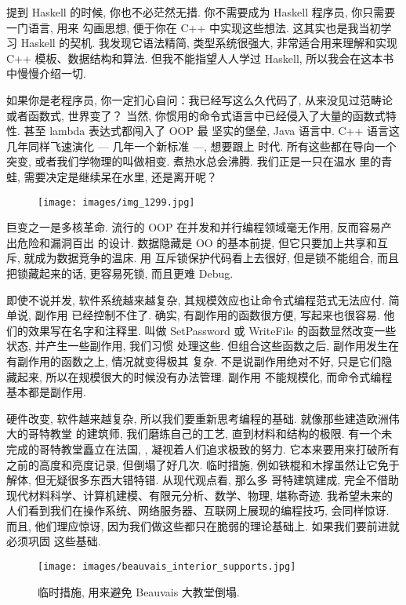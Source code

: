 提到 Haskell 的时候, 你也不必茫然无措. 你不需要成为 Haskell 程序员, 你只需要一门语言, 用来
勾画思想, 便于你在 C++ 中实现这些想法. 这其实也是我当初学习 Haskell 的契机. 我发现它语法精简,
类型系统很强大, 非常适合用来理解和实现 C++ 模板、数据结构和算法. 但我不能指望人人学过 Haskell,
所以我会在这本书中慢慢介绍一切.

如果你是老程序员, 你一定扪心自问：我已经写这么久代码了, 从来没见过范畴论或者函数式, 世界变了？
当然, 你惯用的命令式语言中已经侵入了大量的函数式特性. 甚至 lambda 表达式都闯入了 OOP 最
坚实的堡垒, Java 语言中. C++ 语言这几年同样飞速演化 --- 几年一个新标准 ---, 想要跟上
时代. 所有这些都在导向一个突变, 或者我们学物理的叫做相变. 煮热水总会沸腾. 我们正是一只在温水
里的青蛙, 需要决定是继续呆在水里, 还是离开呢？

\begin{figure}[H]
  \centering
  \texttt{[image: images/img\_1299.jpg]}
\end{figure}

\noindent

巨变之一是多核革命. 流行的 OOP 在并发和并行编程领域毫无作用, 反而容易产出危险和漏洞百出
的设计. 数据隐藏是 OO 的基本前提, 但它只要加上共享和互斥, 就成为数据竞争的温床. 用
互斥锁保护代码看上去很好, 但是锁不能组合, 而且把锁藏起来的话, 更容易死锁, 而且更难 Debug.

即使不说并发, 软件系统越来越复杂, 其规模效应也让命令式编程范式无法应付. 简单说, 副作用
已经控制不住了. 确实, 有副作用的函数很方便, 写起来也很容易. 他们的效果写在名字和注释里.
叫做 SetPassword 或 WriteFile 的函数显然改变一些状态, 并产生一些副作用, 我们习惯
处理这些. 但组合这些函数之后, 副作用发生在有副作用的函数之上, 情况就变得极其
复杂. 不是说副作用绝对不好, 只是它们隐藏起来, 所以在规模很大的时候没有办法管理. 副作用
不能规模化, 而命令式编程基本都是副作用.

硬件改变, 软件越来越复杂, 所以我们要重新思考编程的基础. 就像那些建造欧洲伟大的哥特教堂
的建筑师, 我们磨练自己的工艺, 直到材料和结构的极限. 有一个未完成的哥特教堂矗立在法国,
,
凝视着人们追求极致的努力. 它本来要用来打破所有之前的高度和亮度记录, 但倒塌了好几次.
临时措施, 例如铁棍和木撑虽然让它免于解体, 但无疑很多东西大错特错. 从现代观点看, 那么多
哥特建筑建成, 完全不借助现代材料科学、计算机建模、有限元分析、数学、物理, 堪称奇迹.
我希望未来的人们看到我们在操作系统、网络服务器、互联网上展现的编程技巧, 会同样惊讶.
而且, 他们理应惊讶, 因为我们做这些都只在脆弱的理论基础上. 如果我们要前进就必须巩固
这些基础.

\begin{figure}
  \centering
  \texttt{[image: images/beauvais\_interior\_supports.jpg]}
  \caption{临时措施, 用来避免 Beauvais 大教堂倒塌. }
\end{figure}
